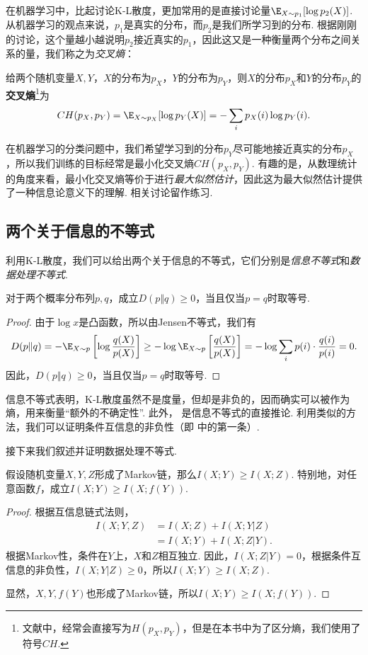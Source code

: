 在机器学习中，比起讨论K-L散度，更加常用的是直接讨论量$\E_{X\sim p_1}[\log p_2(X)]$. 从机器学习的观点来说，$p_1$是真实的分布，而$p_2$是我们所学习到的分布. 根据刚刚的讨论，这个量越小越说明$p_2$接近真实的$p_1$，因此这又是一种衡量两个分布之间关系的量，我们称之为\emph{交叉熵}：
\begin{definition}[交叉熵]
给两个随机变量$X,Y$，$X$的分布为$p_X$，$Y$的分布为$p_Y$，则$X$的分布$p_X$和$Y$的分布$p_Y$的\textbf{交叉熵}\footnote{文献中，经常会直接写为$H(p_X,p_Y)$，但是在本书中为了区分熵，我们使用了符号$CH$.}为
\[CH(p_X,p_Y)=\E_{X\sim p_X}[\log p_Y(X)]=-\sum_ip_X(i)\log p_Y(i).\]
\end{definition}
在机器学习的分类问题中，我们希望学习到的分布$p_Y$尽可能地接近真实的分布$p_X$，所以我们训练的目标经常是最小化交叉熵$CH(p_X,p_Y)$. 有趣的是，从数理统计的角度来看，最小化交叉熵等价于进行\emph{最大似然估计}，因此这为最大似然估计提供了一种信息论意义下的理解. 相关讨论留作练习.

\subsection{两个关于信息的不等式}
利用K-L散度，我们可以给出两个关于信息的不等式，它们分别是\emph{信息不等式}和\emph{数据处理不等式}.

\begin{theorem}[信息不等式]\label{thm:information-inequality}
    对于两个概率分布列$p,q$，成立$D(p\Vert q)\geq0$，当且仅当$p=q$时取等号.
\end{theorem}
\begin{proof}
    由于$\log x$是凸函数，所以由Jensen不等式，我们有
    \[D(p\Vert q)=-\E_{X\sim p}\left[\log\frac{q(X)}{p(X)}\right]\geq-\log \E_{X\sim p}\left[\frac{q(X)}{p(X)}\right]=-\log\sum_ip(i)\cdot\frac{q(i)}{p(i)}=0.\]
    因此，$D(p\Vert q)\geq0$，当且仅当$p=q$时取等号.
\end{proof}

信息不等式表明，K-L散度虽然不是度量，但却是非负的，因而确实可以被作为熵，用来衡量“额外的不确定性”. 此外， 是信息不等式的直接推论. 利用类似的方法，我们可以证明条件互信息的非负性（即 中的第一条）.

接下来我们叙述并证明数据处理不等式.
\begin{theorem}[数据处理不等式]\label{thm:data-processing-inequality}
    假设随机变量$X,Y,Z$形成了Markov链，那么$I(X;Y)\geq I(X;Z)$. 特别地，对任意函数$f$，成立$I(X;Y)\geq I(X;f(Y))$.
\end{theorem}
\begin{proof}
根据互信息链式法则，
    \begin{align*}
        I(X;Y,Z)&=I(X;Z)+I(X;Y|Z)\\
        &=I(X;Y)+I(X;Z|Y).
    \end{align*}
根据Markov性，条件在$Y$上，$X$和$Z$相互独立. 因此，$I(X;Z|Y)=0$，根据条件互信息的非负性，$I(X;Y|Z)\geq0$，所以$I(X;Y)\geq I(X;Z)$.

显然，$X,Y,f(Y)$也形成了Markov链，所以$I(X;Y)\geq I(X;f(Y))$.
\end{proof}

